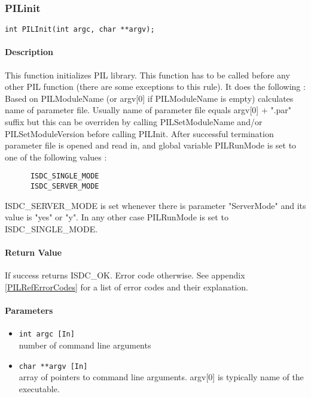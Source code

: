 
\subsubsection{PILinit}

\begin{verbatim}
int PILInit(int argc, char **argv); 
\end{verbatim}

\paragraph{Description\\}
This function initializes PIL library. This function has to be called before
any other PIL function (there are some
exceptions to this rule).  It does the following : \\
Based on PILModuleName (or argv[0] if PILModuleName is empty) calculates
name of parameter file. Usually name
of parameter file equals argv[0] + ".par" suffix but this can be overriden
by calling PILSetModuleName and/or
PILSetModuleVersion before calling PILInit. After successful termination
parameter file is opened and read in, and
global variable PILRunMode is set to one of the following values : 

\begin{verbatim}
      ISDC_SINGLE_MODE 
      ISDC_SERVER_MODE 
\end{verbatim}

ISDC\_SERVER\_MODE is set whenever there is parameter "ServerMode" and its
value is "yes" or "y". In any other case PILRunMode is set
to ISDC\_SINGLE\_MODE. 

\paragraph{Return Value\\}
If success returns ISDC\_OK. Error code otherwise. See appendix \ref{PILRefErrorCodes}
for a list of error codes and their explanation.

\paragraph{Parameters}
\begin{itemize}
\item
{\tt int argc [In] } \\
number of command line arguments
\item
{\tt char **argv [In] } \\
array of pointers to command line arguments. argv[0] is typically name of
the executable.
\end{itemize}


